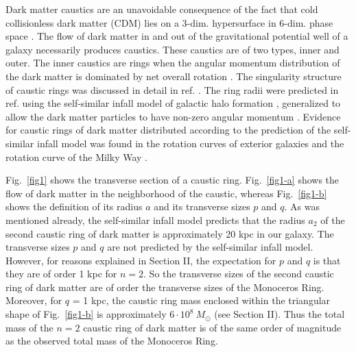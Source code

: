 \documentclass[aps,prd,preprint,tightenlines,floatfix,showpacs,groupedaddress]{revtex4}
\begin{document}
Dark matter caustics are an unavoidable consequence of the fact that 
cold collisionless dark matter (CDM) lies on a 3-dim. hypersurface in 
6-dim. phase space \cite{ipser,sing,Trem,rob}.  The flow of dark 
matter in and out of the gravitational potential well of a galaxy 
necessarily produces caustics.  These caustics are of two types, 
inner and outer.  The inner caustics are rings when the angular 
momentum distribution of the dark matter is dominated by net overall 
rotation \cite{inn}.  The singularity structure of caustic rings was
discussed in detail in ref. \cite{sing}.  The ring radii were predicted 
in ref. \cite{cr} using the self-similar infall model of galactic halo 
formation \cite{FG,B}, generalized to allow the dark matter particles 
to have non-zero angular momentum \cite{STW}.  Evidence for caustic 
rings of dark matter distributed according to the prediction of the 
self-similar infall model was found in the rotation curves of exterior 
galaxies \cite{Kinn} and the rotation curve of the Milky Way \cite{milk}.

Fig.~\ref{fig1} shows the transverse section of a caustic ring.  
Fig.~\ref{fig1-a}  shows the flow of dark matter in the neighborhood 
of the caustic, whereas Fig.~\ref{fig1-b} shows the definition of its 
radius $a$ and its transverse sizes $p$ and $q$.  As was mentioned already, 
the self-similar infall model predicts that the radius $a_2$ of the second
caustic ring of dark matter is approximately 20 kpc in our galaxy.  The
transverse sizes $p$ and $q$ are not predicted by the self-similar infall 
model.  However, for reasons explained in Section II,  the expectation for
$p$ and $q$ is that they are of order 1 kpc for $n=2$. So the transverse 
sizes of the second caustic ring of dark matter are of order the
transverse sizes of the Monoceros Ring.  Moreover, for $q$ = 1 kpc, 
the caustic ring mass enclosed within the triangular shape of 
Fig.~\ref{fig1-b} is approximately $6 \cdot 10^8~M_\odot$ (see 
Section II).  Thus the total mass of the $n=2$ caustic ring of dark 
matter is of the same order of magnitude as the observed total mass 
of the Monoceros Ring.
\end{document}

